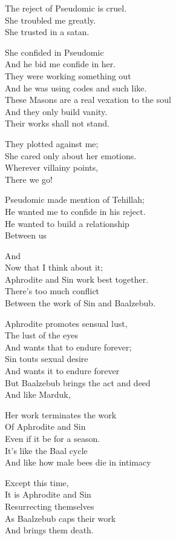 \documentclass[
]{book}
\begin{document}
The reject of Pseudomic is cruel.\\
She troubled me greatly.\\
She trusted in a satan.

She confided in Pseudomic\\
And he bid me confide in her.\\
They were working something out\\
And he was using codes and such like.\\
These Masons are a real vexation to the soul\\
And they only build vanity.\\
Their works shall not stand.

They plotted against me;\\
She cared only about her emotions.\\
Wherever villainy points,\\
There we go!

Pseudomic made mention of Tehillah;\\
He wanted me to confide in his reject.\\
He wanted to build a relationship\\
Between us

And\\
Now that I think about it;\\
Aphrodite and Sin work best together.\\
There's too much conflict\\
Between the work of Sin and Baalzebub.

Aphrodite promotes sensual lust,\\
The lust of the eyes\\
And wants that to endure forever;\\
Sin touts sexual desire\\
And wants it to endure forever\\
But Baalzebub brings the act and deed\\
And like Marduk,

Her work terminates the work\\
Of Aphrodite and Sin\\
Even if it be for a season.\\
It's like the Baal cycle\\
And like how male bees die in intimacy

Except this time,\\
It is Aphrodite and Sin\\
Resurrecting themselves\\
As Baalzebub caps their work\\
And brings them death.
\end{document}

